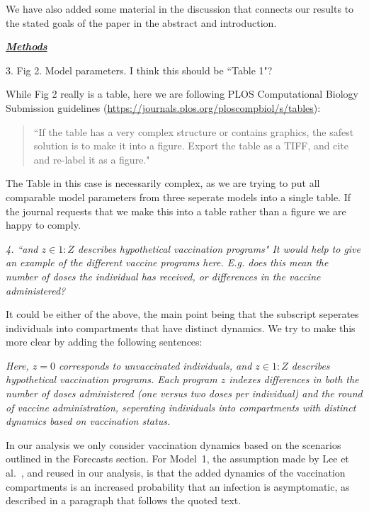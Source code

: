 \documentclass[11pt]{article}
\newcommand\seq[2]{{#1}\!:\!{#2}}
\newcommand\vaccClass{Z}
\newcommand\vaccCounter{z}
\newcommand\report[1]{{\color{mygreen} \vspace{1mm}\hspace{0.25in}\parbox{6in}{\em #1}}}
\newcommand\article[1]{{\color{blue} \vspace{1mm}\hspace{0.25in}\parbox{6in}{\em #1}}}
\begin{document}
\article{\editModelingGuidance}


We have also added some material in the discussion that connects our results to the stated goals of the paper in the abstract and introduction.

\report{
  \textbf{\underline{Methods}}

3.  Fig 2. Model parameters. I think this should be ``Table 1"?
}

While Fig 2 really is a table, here we are following PLOS Computational Biology Submission guidelines (\url{https://journals.plos.org/ploscompbiol/s/tables}):
\begin{quote}
``If the table has a very complex structure or contains graphics, the safest solution is to make it into a figure. Export the table as a TIFF, and cite and re-label it as a figure."
\end{quote}
The Table in this case is necessarily complex, as we are trying to put all comparable model parameters from three seperate models into a single table.
If the journal requests that we make this into a table rather than a figure we are happy to comply.

\report{4.
    ``and $z \in 1:Z$ describes hypothetical vaccination programs" It would help to give an example of the different vaccine programs here. E.g. does this mean the number of doses the individual has received, or differences in the vaccine administered?
}

It could be either of the above, the main point being that the subscript seperates individuals into compartments that have distinct dynamics. We try to make this more clear by adding the following sentences:

\article{Here, $\vaccCounter=0$ corresponds to unvaccinated individuals, and $\vaccCounter \in \seq{1}{\vaccClass}$ describes hypothetical vaccination programs. Each program $\vaccCounter$ indexes differences in both the number of doses administered (one versus two doses per individual) and the round of vaccine administration, seperating individuals into compartments with distinct dynamics based on vaccination status.}

In our analysis we only consider vaccination dynamics based on the scenarios outlined in the Forecasts section. For Model~1, the assumption made by Lee et al.~\cite{lee20}, and reused in our analysis, is that the added dynamics of the vaccination compartments is an increased probability that an infection is asymptomatic, as described in a paragraph that follows the quoted text.
\end{document}
